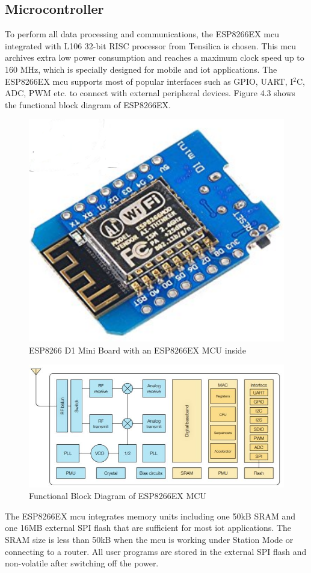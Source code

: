 \documentclass[letterpaper,12pt,titlepage,oneside,final]{book}
\let\origdoublepage\cleardoublepage
\newcommand{\clearemptydoublepage}{%
	\clearpage{\pagestyle{empty}\origdoublepage}}
\let\cleardoublepage\clearemptydoublepage
\begin{document}
\subsection{Microcontroller}
To perform all data processing and communications, the ESP8266EX \gls{mcu} integrated with L106 32-bit RISC processor from Tensilica is chosen. This \gls{mcu} archives extra low power consumption and reaches a maximum clock speed up to 160 MHz, which is specially designed for mobile and \gls{iot} applications. The ESP8266EX \gls{mcu} supports most of popular interfaces such as GPIO, UART, I$^{2}$C, ADC, PWM etc. to connect with external peripheral devices. Figure 4.3 shows the functional block diagram of ESP8266EX. \par 
\begin{figure}[h]
	\centering
	\includegraphics[scale=0.5]{esp8266}
	\caption{ESP8266 D1 Mini Board with an ESP8266EX MCU inside}
\end{figure}
\cleardoublepage
\begin{figure}[h]
	\centering
	\includegraphics[scale=0.8]{functional_diagram}
	\caption{Functional Block Diagram of ESP8266EX MCU\cite{block_diagram}}
\end{figure}
The ESP8266EX \gls{mcu} integrates memory units including one 50kB SRAM and one 16MB external SPI flash that are sufficient for most \gls{iot} applications. The SRAM size is less than 50kB when the \gls{mcu} is working under Station Mode or connecting to a router. All user programs are stored in the external SPI flash and non-volatile after switching off the power.
\end{document}
